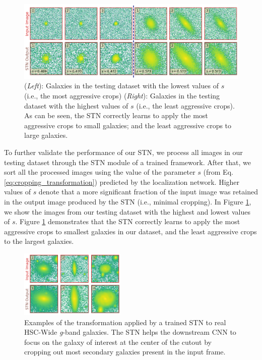 \begin{figure}[htb]
    \centering
    \includegraphics[width
    =\textwidth]{most_least_crops.png}
    \caption{(\textit{Left}): Galaxies in the testing dataset with the lowest values of $s$ (i.e., the most aggressive crops) (\textit{Right}): Galaxies in the testing dataset with the highest values of $s$ (i.e., the least aggressive crops). As can be seen, the STN correctly learns to apply the most aggressive crops to small galaxies; and the least aggressive crops to large galaxies.}
    \label{fig_c2:most_least_crops}
\end{figure}

To further validate the performance of our STN, we process all images in our testing dataset through the STN module of a trained \gampen{} framework. After that, we sort all the processed images using the value of the parameter $s$ (from Eq. \ref{eq:cropping_transformation}) predicted by the localization network. Higher values of $s$ denote that a more significant fraction of the input image was retained in the output image produced by the STN  (i.e., minimal cropping). In Figure \ref{fig_c2:most_least_crops}, we show the images from our testing dataset with the highest and lowest values of $s$. Figure \ref{fig_c2:most_least_crops} demonstrates that the STN correctly learns to apply the most aggressive crops to smallest galaxies in our dataset, and the least aggressive crops to the largest galaxies.

\begin{figure}[htb]
    \centering
    \includegraphics[width
    =0.45\textwidth]{real_galaxies_stn.png}
    \caption{Examples of the transformation applied by a trained STN to real HSC-Wide \textit{g}-band galaxies. The STN helps the downstream CNN to focus on the galaxy of interest at the center of the cutout by cropping out most secondary galaxies present in the input frame.}
    \label{fig_c2:real_galaxies_stn}
\end{figure}


